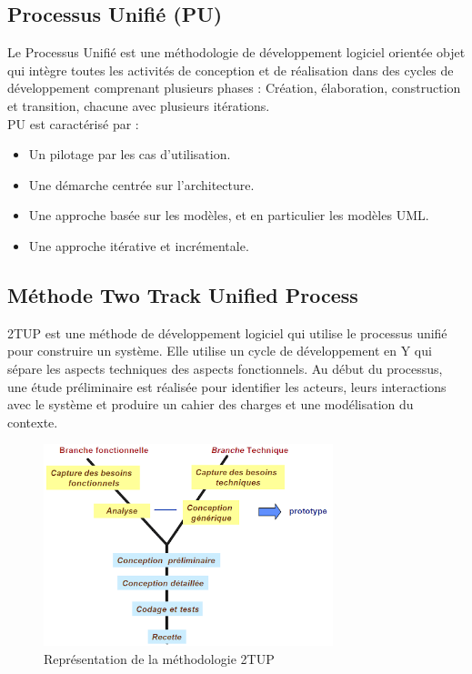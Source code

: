 \subsection{Processus Unifié (PU)}
Le Processus Unifié est une méthodologie de développement logiciel orientée objet qui intègre toutes les activités de conception et de réalisation dans des cycles de développement comprenant plusieurs phases : Création, élaboration, construction et transition, chacune avec plusieurs itérations.\\
PU est caractérisé par :
\begin{itemize}[itemsep=2pt, parsep=2pt]
    \item Un pilotage par les cas d’utilisation.
    \item Une démarche centrée sur l’architecture.
    \item Une approche basée sur les modèles, et en particulier les modèles UML.
    \item Une approche itérative et incrémentale.
\end{itemize}

\subsection{Méthode Two Track Unified Process}
2TUP est une méthode de développement logiciel qui utilise le processus unifié pour construire un système. Elle utilise un cycle de développement en Y qui sépare les aspects techniques des aspects fonctionnels. Au début du processus, une étude préliminaire est réalisée pour identifier les acteurs, leurs interactions avec le système et produire un cahier des charges et une modélisation du contexte.

\begin{figure}[H]
    \centering
    \includegraphics[width=0.75\textwidth,height=0.65\textwidth]{images/chapitre-1/2tup.png}
    \caption{Représentation de la méthodologie 2TUP \cite{2tup}}
    \label{fig:2tup-image}    
\end{figure}

